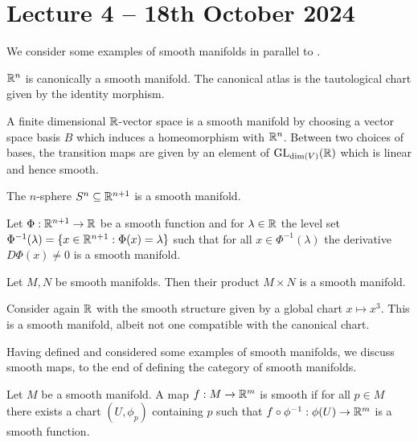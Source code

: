 \section{Lecture 4 -- 18th October 2024}\label{sec: lecture 4}
We consider some examples of smooth manifolds in parallel to . 
\begin{example}\label{ex: Rn is a sm mfld}
    $\mathbb{R}^{n}$ is canonically a smooth manifold. The canonical atlas is the tautological chart given by the identity morphism. 
\end{example}
\begin{example}\label{ex: fd real vs is a sm mfld}
    A finite dimensional $\mathbb{R}$-vector space is a smooth manifold by choosing a vector space basis $B$ which induces a homeomorphism with $\mathbb{R}^{n}$. Between two choices of bases, the transition maps are given by an element of $\mathrm{GL}_{\dim(V)}(\mathbb{R})$ which is linear and hence smooth. 
\end{example}
\begin{example}\label{ex: spheres are sm mflds}
    The $n$-sphere $S^{n}\subseteq\mathbb{R}^{n+1}$ is a smooth manifold. 
\end{example}
\begin{example}\label{ex: level sets are smooth manifolds}
    Let $\Phi:\mathbb{R}^{n+1}\to\mathbb{R}$ be a smooth function and for $\lambda\in\mathbb{R}$ the level set $\Phi^{-1}(\lambda)=\{x\in\mathbb{R}^{n+1}:\Phi(x)=\lambda\}$ such that for all $x\in\Phi^{-1}(\lambda)$ the derivative $D\Phi(x)\neq0$ is a smooth manifold. 
\end{example}
\begin{example}\label{ex: products are smooth manifolds}
    Let $M,N$ be smooth manifolds. Then their product $M\times N$ is a smooth manifold. 
\end{example}
\begin{example}
    Consider again $\mathbb{R}$ with the smooth structure given by a global chart $x\mapsto x^{3}$. This is a smooth manifold, albeit not one compatible with the canonical chart. 
\end{example}
Having defined and considered some examples of smooth manifolds, we discuss smooth maps, to the end of defining the category of smooth manifolds. 
\begin{definition}\label{def: smooth map}
    Let $M$ be a smooth manifold. A map $f:M\to\mathbb{R}^{m}$ is smooth if for all $p\in M$ there exists a chart $(U,\phi_{p})$ containing $p$ such that $f\circ\phi^{-1}:\phi(U)\to\mathbb{R}^{m}$ is a smooth function. 
\end{definition}
